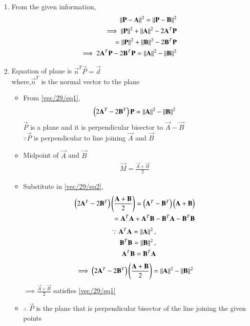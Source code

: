 %
\begin{enumerate}
\item From the given information,
\begin{align}
\left\lVert\mathbf{P}-\mathbf{A}\right\rVert^2=\left\lVert\mathbf{P}-\mathbf{B}\right\rVert^2
\\
\implies\left\lVert\mathbf{P}\right\rVert^2+\left\lVert\mathbf{A}\right\rVert^2-2\mathbf{A}^T\mathbf{P}
\\
=\left\lVert\mathbf{P}\right\rVert^2+\left\lVert\mathbf{B}\right\rVert^2-2\mathbf{B}^T\mathbf{P}
\\
\implies 2\mathbf{A}^T\mathbf{P}-2\mathbf{B}^T\mathbf{P}=\left\lVert\mathbf{A}\right\rVert^2-\left\lVert\mathbf{B}\right\rVert^2  \label{vec/29/eq1}
\end{align}
\item Equation of plane is $\vec{n}^T\vec{P}=\vec{d}$
\\
where,$\vec{n}^T$ is the normal vector to the plane 
\begin{itemize}
\item From \eqref{vec/29/eq1},
\begin{align}
\begin{pmatrix}2\mathbf{A}^T-2\mathbf{B}^T\end{pmatrix}\mathbf{P}=\left\lVert\mathbf{A}\right\rVert^2-\left\lVert\mathbf{B}\right\rVert^2 \label{vec/29/eq2}
\end{align}
$\vec{P}$ is a plane and it is perpendicular bisector to $\vec{A}-\vec{B}$
\\
$\because\vec{P}$ is perpendicular to line joining $\vec{A}$ and $\vec{B}$
\item Midpoint of $\vec{A}$ and $\vec{B}$
\begin{align}
\vec{M}= \frac{\vec{A}+\vec{B}}{2}
\end{align}
\item Substitute in \eqref{vec/29/eq2},
\begin{align}
\begin{pmatrix}2\mathbf{A}^T-2\mathbf{B}^T\end{pmatrix}\left(\frac{\mathbf{A}+\mathbf{B}}{2}\right)
=\begin{pmatrix}\mathbf{A}^T-\mathbf{B}^T\end{pmatrix}\begin{pmatrix}\mathbf{A}+\mathbf{B}\end{pmatrix}
\\
=\mathbf{A}^T\mathbf{A}+\mathbf{A}^T\mathbf{B}-\mathbf{B}^T\mathbf{A}-\mathbf{B}^T\mathbf{B}
\end{align}
\begin{align}
\because \mathbf{A}^T\mathbf{A}=\left\lVert\mathbf{A}\right\rVert^2,
\\
\mathbf{B}^T\mathbf{B}=\left\lVert\mathbf{B}\right\rVert^2,
\\
\mathbf{A}^T\mathbf{B}=\mathbf{B}^T\mathbf{A}
\end{align}
\begin{align}
\implies\begin{pmatrix}2\mathbf{A}^T-2\mathbf{B}^T\end{pmatrix}\left(\frac{\mathbf{A}+\mathbf{B}}{2}\right)=\left\lVert\mathbf{A}\right\rVert^2-\left\lVert\mathbf{B}\right\rVert^2 
\end{align}
$\implies \frac{\vec{A}+\vec{B}}{2}$ satisfies \eqref{vec/29/eq1}
\item $\therefore$ $\vec{P}$ is the plane that is perpendicular bisector of the line joining the given points 

\end{itemize}
\end{enumerate}
